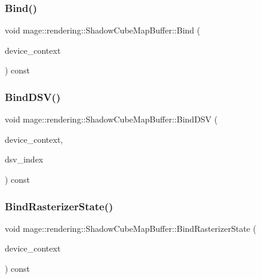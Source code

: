 \subsubsection{\texorpdfstring{Bind()}{Bind()}}
{\footnotesize\ttfamily void mage\+::rendering\+::\+Shadow\+Cube\+Map\+Buffer\+::\+Bind (\begin{DoxyParamCaption}\item[{I\+D3\+D11\+Device\+Context \&}]{device\+\_\+context }\end{DoxyParamCaption}) const\hspace{0.3cm}{\ttfamily [noexcept]}}

\hypertarget{classmage_1_1rendering_1_1_shadow_cube_map_buffer_ad64e3c0b0c537e4e3f6b301fefb5c60a}{}\label{classmage_1_1rendering_1_1_shadow_cube_map_buffer_ad64e3c0b0c537e4e3f6b301fefb5c60a} 
\subsubsection{\texorpdfstring{Bind\+D\+S\+V()}{BindDSV()}}
{\footnotesize\ttfamily void mage\+::rendering\+::\+Shadow\+Cube\+Map\+Buffer\+::\+Bind\+D\+SV (\begin{DoxyParamCaption}\item[{I\+D3\+D11\+Device\+Context \&}]{device\+\_\+context,  }\item[{size\+\_\+t}]{dsv\+\_\+index }\end{DoxyParamCaption}) const\hspace{0.3cm}{\ttfamily [noexcept]}}

\hypertarget{classmage_1_1rendering_1_1_shadow_cube_map_buffer_aa206227920ac298eb4dcfdc8e662663d}{}\label{classmage_1_1rendering_1_1_shadow_cube_map_buffer_aa206227920ac298eb4dcfdc8e662663d} 
\subsubsection{\texorpdfstring{Bind\+Rasterizer\+State()}{BindRasterizerState()}}
{\footnotesize\ttfamily void mage\+::rendering\+::\+Shadow\+Cube\+Map\+Buffer\+::\+Bind\+Rasterizer\+State (\begin{DoxyParamCaption}\item[{I\+D3\+D11\+Device\+Context \&}]{device\+\_\+context }\end{DoxyParamCaption}) const\hspace{0.3cm}{\ttfamily [noexcept]}}


